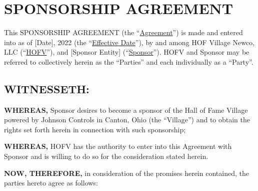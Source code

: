 \documentclass{article}
\begin{document}
\hypertarget{sponsorship-agreement}{%
\section{SPONSORSHIP AGREEMENT}\label{sponsorship-agreement}}

This SPONSORSHIP AGREEMENT (the ``\uline{Agreement}'') is made and
entered into as of {[}Date{]}, 2022 (the ``\uline{Effective Date}''), by
and among HOF Village Newco, LLC (``\uline{HOFV}''), and {[}Sponsor
Entity{]} (``\uline{Sponsor}''). HOFV and Sponsor may be referred to
collectively herein as the ``Parties'' and each individually as a
``Party''.

\hypertarget{witnesseth}{%
\subsection{WITNESSETH:}\label{witnesseth}}

\textbf{WHEREAS,} Sponsor desires to become a sponsor of the Hall of
Fame Village powered by Johnson Controls in Canton, Ohio (the
``Village'') and to obtain the rights set forth herein in connection
with such sponsorship;

\textbf{WHEREAS,} HOFV has the authority to enter into this Agreement
with Sponsor and is willing to do so for the consideration stated
herein.

\textbf{NOW, THEREFORE,} in consideration of the promises herein
contained, the parties hereto agree as follows:
\end{document}
